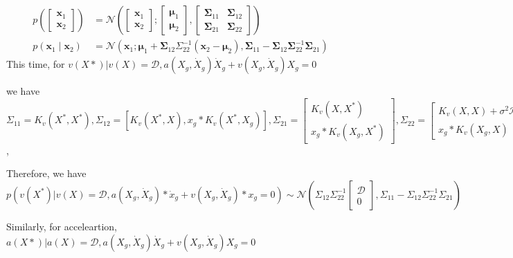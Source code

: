 \documentclass{article}
\begin{document}
$$
\begin{aligned}
p\left(\left[\begin{array}{l}
\mathbf{x}_{1} \\
\mathbf{x}_{2}
\end{array}\right]\right) &=\mathcal{N}\left(\left[\begin{array}{l}
\mathbf{x}_{1} \\
\mathbf{x}_{2}
\end{array}\right] ;\left[\begin{array}{l}
\boldsymbol{\mu}_{1} \\
\boldsymbol{\mu}_{2}
\end{array}\right],\left[\begin{array}{ll}
\boldsymbol{\Sigma}_{11} & \boldsymbol{\Sigma}_{12} \\
\boldsymbol{\Sigma}_{21} & \boldsymbol{\Sigma}_{22}
\end{array}\right]\right) \\
p\left(\mathbf{x}_{1} \mid \mathbf{x}_{2}\right) &=\mathcal{N}\left(\mathbf{x}_{1} ; \boldsymbol{\mu}_{1}+\boldsymbol{\Sigma}_{12} \Sigma_{22}^{-1}\left(\mathbf{x}_{2}-\boldsymbol{\mu}_{2}\right), \boldsymbol{\Sigma}_{11}-\boldsymbol{\Sigma}_{12} \boldsymbol{\Sigma}_{22}^{-1} \boldsymbol{\Sigma}_{21}\right)
\end{aligned}
$$
This time, for $v(X*)|v(X)=\mathcal{D}, a(X_g,\dot{X}_g)\dot{X}_g +v(X_g, \dot{X}_g)X_g=0$ 

we have $\Sigma_{11}=K_v(X^*, X^*), \Sigma_{12}=[K_v(X^*, X), x_g*K_v(X^*, X_g)], \Sigma_{21} = \begin{bmatrix}
  K_v(X, X^*)\\x_g*K_v(X_g, X^*)
\end{bmatrix}, \Sigma_{22}=\begin{bmatrix}
  K_v(X, X)+\sigma^2\mathcal{I} & x_g*K_v(X,X_g) \\ x_g*K_v(X_g, X) & \dot{x}_g*K_a(X_g, X_g)*\dot{x}_g^T + x_g*K_v(X_g, X_g)*x_g^T
\end{bmatrix}$, 

Therefore, we have 
$$
p(v(X^*)|v(X)=\mathcal{D},a(X_g,\dot{X}_g)*\dot{x}_g +v(X_g, \dot{X}_g)*x_g=0)\sim\mathcal{N}\left(\Sigma_{12}\Sigma_{22}^{-1}\begin{bmatrix}
  \mathcal{D}\\0
\end{bmatrix}, \Sigma_{11}-\Sigma_{12}\Sigma_{22}^{-1}\Sigma_{21}\right)
$$

Similarly, for acceleartion, 
 $a(X*)|a(X)=\mathcal{D}, a(X_g,\dot{X}_g)\dot{X}_g +v(X_g, \dot{X}_g)X_g=0$ 
\end{document}
